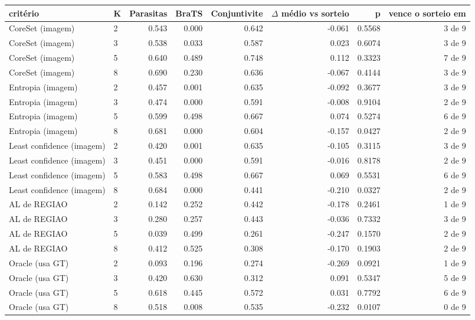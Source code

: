 \begin{tabular}{llrrrrrr}
\hline
critério & K & Parasitas & BraTS & Conjuntivite & $\Delta$ médio vs sorteio & p & vence o sorteio em \\
\hline
CoreSet (imagem) & 2 & 0.543 & 0.000 & 0.642 & -0.061 & 0.5568 & 3 de 9 \\
CoreSet (imagem) & 3 & 0.538 & 0.033 & 0.587 & 0.023 & 0.6074 & 3 de 9 \\
CoreSet (imagem) & 5 & 0.640 & 0.489 & 0.748 & 0.112 & 0.3323 & 7 de 9 \\
CoreSet (imagem) & 8 & 0.690 & 0.230 & 0.636 & -0.067 & 0.4144 & 3 de 9 \\
Entropia (imagem) & 2 & 0.457 & 0.001 & 0.635 & -0.092 & 0.3677 & 3 de 9 \\
Entropia (imagem) & 3 & 0.474 & 0.000 & 0.591 & -0.008 & 0.9104 & 2 de 9 \\
Entropia (imagem) & 5 & 0.599 & 0.498 & 0.667 & 0.074 & 0.5274 & 6 de 9 \\
Entropia (imagem) & 8 & 0.681 & 0.000 & 0.604 & -0.157 & 0.0427 & 2 de 9 \\
Least confidence (imagem) & 2 & 0.420 & 0.001 & 0.635 & -0.105 & 0.3115 & 3 de 9 \\
Least confidence (imagem) & 3 & 0.451 & 0.000 & 0.591 & -0.016 & 0.8178 & 2 de 9 \\
Least confidence (imagem) & 5 & 0.583 & 0.498 & 0.667 & 0.069 & 0.5531 & 6 de 9 \\
Least confidence (imagem) & 8 & 0.684 & 0.000 & 0.441 & -0.210 & 0.0327 & 2 de 9 \\
AL de REGIAO & 2 & 0.142 & 0.252 & 0.442 & -0.178 & 0.2461 & 1 de 9 \\
AL de REGIAO & 3 & 0.280 & 0.257 & 0.443 & -0.036 & 0.7332 & 3 de 9 \\
AL de REGIAO & 5 & 0.039 & 0.499 & 0.261 & -0.247 & 0.1570 & 2 de 9 \\
AL de REGIAO & 8 & 0.412 & 0.525 & 0.308 & -0.170 & 0.1903 & 2 de 9 \\
Oracle (usa GT) & 2 & 0.093 & 0.196 & 0.274 & -0.269 & 0.0921 & 1 de 9 \\
Oracle (usa GT) & 3 & 0.420 & 0.630 & 0.312 & 0.091 & 0.5347 & 5 de 9 \\
Oracle (usa GT) & 5 & 0.618 & 0.445 & 0.572 & 0.031 & 0.7792 & 6 de 9 \\
Oracle (usa GT) & 8 & 0.518 & 0.008 & 0.535 & -0.232 & 0.0107 & 0 de 9 \\
\hline
\end{tabular}
